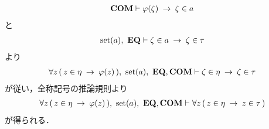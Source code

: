 \begin{sketch}
\begin{description}
\begin{itemize}
\begin{align}
							\mbox{\bf COM} \vdash \varphi(\zeta) \hspace{0.25em}\rightarrow\hspace{0.25em} \zeta \in a
						\end{align}
						と
						\begin{align}
							\operatorname*{set} (a),\ \mbox{{\bf EQ}} \vdash \zeta \in a \hspace{0.25em}\rightarrow\hspace{0.25em} \zeta \in \tau
						\end{align}
						より
						\begin{align}
							\forall z\, (\, z \in \eta \rarrow \varphi(z)\, ),\ 
							\set{a},\ \EQAX,\COMAX
							\vdash \zeta \in \eta \rarrow \zeta \in \tau
						\end{align}
						が従い，全称記号の推論規則より
						\begin{align}
							\forall z\, (\, z \in \eta \rarrow \varphi(z)\, ),\ 
							\set{a},\ \EQAX,\COMAX \vdash 
							\forall z\, (\, z \in \eta \rarrow z \in \tau\, )
						\end{align}
						が得られる．
					

\end{itemize}
\end{description}
\end{sketch}
